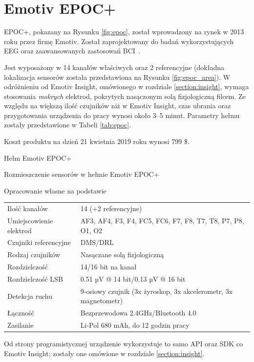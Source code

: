 \documentclass[skorowidz,skroty]{dyplomWEZUT}
\begin{document}
\section{Emotiv EPOC+\label{section:epoc}}
EPOC+, pokazany na Rysunku \vref{fig:epoc}, został wprowadzony na rynek w 2013 roku przez firmę Emotiv. Został zaprojektowany do badań wykorzystujących EEG oraz zaawansowanych zastosowań BCI~\cite{emotiv_epoc}.

Jest wyposażony w 14 kanałów właściwych oraz 2 referencyjne (dokładna lokalizacja sensorów została przedstawiona na Rysunku \vref{fig:epoc_area}). W odróżnieniu od Emotiv Insight, omówionego w rozdziale \vref{section:insight}, wymaga stosowania \textit{mokrych} elektrod, pokrytych nasączonym solą fizjologiczną filcem. Ze względu na większą ilość czujników niż w Emotiv Insight, czas ubrania oraz przygotowania urządzenia do pracy wynosi około 3--5 minut. Parametry hełmu zostały przedstawione w Tabeli \vref{tab:epoc}.

Koszt produktu na dzień 21 kwietnia 2019 roku wynosi 799 \$.

{Hełm Emotiv EPOC+\label{fig:epoc}}
{\cite{emotiv_epoc}}

{Rozmieszczenie sensorów w hełmie Emotiv EPOC+\label{fig:epoc_area}}
{\cite{emotiv_epoc}}

{Opracowanie własne na podstawie~\cite{emotiv_comparison}}
{
    \begin{tabular}{l|l}
        Ilość kanałów & 14 (+2 referencyjne)\\
        Umiejscowienie elektrod & AF3, AF4, F3, F4, FC5, FC6, F7, F8, T7, T8, P7, P8, O1, O2\\
        Czujniki referencyjne & DMS/DRL\\
        Rodzaj czujników & Nasączane solą fizjologiczną\\
        Rozdzielczość & 14/16 bit na kanał\\
        Rozdzielczość LSB & 0.51 µV @ 14 bit/0.13 µV @ 16 bit\\
        Detekcja ruchu & 9-osiowy czujnik (3x żyroskop, 3x akcelerometr, 3x magnetometr)\\
        Łączność & Bezprzewodowa 2.4GHz/Bluetooth 4.0\\
        Zasilanie & Li-Pol 680 mAh, do 12 godzin pracy
    \end{tabular}
}

Od strony programistycznej urządzenie wykorzystuje to samo API oraz SDK co Emotiv Insight; zostały one omówione w rozdziale \vref{section:insight}.
\end{document}
